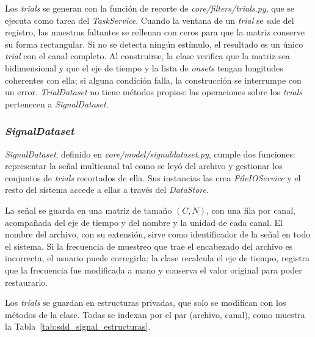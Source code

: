 \documentclass[12pt,letterpaper,oneside]{article}
\DeclareRobustCommand{\_}{\textunderscore\allowbreak}
\begin{document}
Los \textit{trials} se generan con la función de recorte de \textit{core/filters/trials.py}, que se ejecuta como tarea del \textit{TaskService}. Cuando la ventana de un \textit{trial} se sale del registro, las muestras faltantes se rellenan con ceros para que la matriz conserve su forma rectangular. Si no se detecta ningún estímulo, el resultado es un único \textit{trial} con el canal completo. Al construirse, la clase verifica que la matriz sea bidimensional y que el eje de tiempo y la lista de \textit{onsets} tengan longitudes coherentes con ella; si alguna condición falla, la construcción se interrumpe con un error. \textit{TrialDataset} no tiene métodos propios: las operaciones sobre los \textit{trials} pertenecen a \textit{SignalDataset}.

\subsubsection{\textit{SignalDataset}}
\label{sec:sdd_signaldataset}

\textit{SignalDataset}, definido en \textit{core/model/signal\_dataset.py}, cumple dos funciones: representar la señal multicanal tal como se leyó del archivo y gestionar los conjuntos de \textit{trials} recortados de ella. Sus instancias las crea \textit{FileIOService} y el resto del sistema accede a ellas a través del \textit{DataStore}.

La señal se guarda en una matriz de tamaño $(C, N)$, con una fila por canal, acompañada del eje de tiempo y del nombre y la unidad de cada canal. El nombre del archivo, con su extensión, sirve como identificador de la señal en todo el sistema. Si la frecuencia de muestreo que trae el encabezado del archivo es incorrecta, el usuario puede corregirla: la clase recalcula el eje de tiempo, registra que la frecuencia fue modificada a mano y conserva el valor original para poder restaurarlo.

Los \textit{trials} se guardan en estructuras privadas, que solo se modifican con los métodos de la clase. Todas se indexan por el par (archivo, canal), como muestra la Tabla~\ref{tab:sdd_signal_estructuras}.
\end{document}
